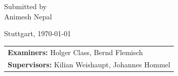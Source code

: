 \vspace{7cm}

\begin{center}
  {\normalsize Submitted by}\\[0.1cm]
  {\large Animesh Nepal}\\[0.1cm]
\end{center}

\vspace{3cm}

\begin{center}
  {\large Stuttgart, \today}
\end{center}

\vspace{0.5cm}

\begin{center}
  {\large 
  \begin{tabular}{l}
  \textbf{Examiners:} Holger Class, Bernd Flemisch\\
  \textbf{Supervisors:} Kilian Weishaupt, Johannes Hommel
  \end{tabular}
  }\\[0.1cm]
\end{center}

\endinput